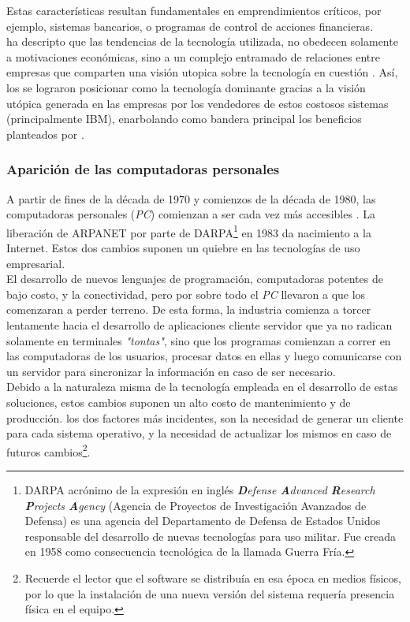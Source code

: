 Estas características resultan fundamentales en emprendimientos críticos, por ejemplo,
sistemas bancarios, o programas de control de acciones financieras.\\
  ha descripto que las tendencias de la
 tecnología utilizada, no obedecen solamente a motivaciones económicas, sino a un
 complejo entramado de relaciones entre empresas que comparten una visión utopica sobre
 la tecnología en cuestión . Así, los \mainframes se
 lograron posicionar como la tecnología dominante gracias a la visión utópica generada
 en las empresas por los vendedores de estos costosos sistemas (principalmente IBM),
 enarbolando como bandera principal los beneficios planteados por
 \citeauthor{Stephens:2008:BOOK}.
 
\subsubsection{Aparición de las computadoras personales}

A partir de fines de la década de 1970 y comienzos de la década de 1980, las computadoras
personales (\emph{PC}) comienzan a ser cada vez más accesibles .
La liberación de ARPANET por parte de DARPA\footnote{
	DARPA acrónimo de la expresión en inglés \emph{\textbf{D}efense \textbf{A}dvanced
	\textbf{R}esearch \textbf{P}rojects \textbf{A}gency} (Agencia de Proyectos de
	Investigación Avanzados de Defensa) es una agencia del Departamento de Defensa de
	Estados Unidos responsable del desarrollo de nuevas tecnologías para uso militar.
	Fue creada en 1958 como consecuencia tecnológica de la llamada Guerra Fría.
} en 1983 da nacimiento a la Internet. Estos dos cambios suponen un quiebre
en las tecnologías de uso empresarial.\\
El desarrollo de nuevos lenguajes de programación, computadoras potentes de bajo costo, y
la conectividad, pero por sobre todo el \emph{PC} llevaron a que los \mainframes comenzaran
a perder terreno. De esta forma, la industria comienza a torcer lentamente hacia el desarrollo
de aplicaciones cliente servidor que ya no radican solamente en terminales \emph{"tontas"},
sino que los programas comienzan a correr en las computadoras de los usuarios, procesar datos
en ellas y luego comunicarse con un servidor para sincronizar la información en caso de ser
necesario.\\
Debido a la naturaleza misma de la tecnología empleada en el desarrollo de estas soluciones,
estos cambios suponen un alto costo de mantenimiento y de producción. los dos factores más
incidentes, son la necesidad de generar un cliente para cada sistema operativo, y la necesidad
de actualizar los mismos en caso de futuros cambios\footnote{
	Recuerde el lector que el software se distribuía en esa época en medios físicos, por
	lo que la instalación de una nueva versión del sistema requería presencia física en el
	equipo.
}.


